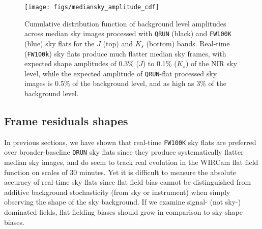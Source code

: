 \documentclass[iop]{emulateapj}
\begin{document}
\begin{figure}[t]
\centering
\texttt{[image: figs/mediansky\_amplitude\_cdf]}
\caption{Cumulative distribution function of background level amplitudes across median sky images processed with \texttt{QRUN} (black) and \texttt{FW100K} (blue) sky flats for the $J$ (top) and $K_s$ (bottom) bands. Real-time (\texttt{FW100k}) sky flats produce much flatter median sky frames, with expected shape amplitudes of 0.3\% ($J$) to 0.1\% ($K_s$) of the NIR sky level, while the expected amplitude of \texttt{QRUN}-flat processed sky images is 0.5\% of the background level, and as high as 3\% of the background level.
}
\label{fig:mediansky_amplitude}
\end{figure}

\subsection{Frame residuals shapes}
\label{sec:frameblockresiduals}

In previous sections, we have shown that real-time \texttt{FW100K} sky flats are preferred over broader-baseline \texttt{QRUN} sky flats since they produce systematically flatter median sky images, and do seem to track real evolution in the WIRCam flat field function on scales of 30 minutes.
Yet it is difficult to measure the absolute accuracy of real-time sky flats since flat field bias cannot be distinguished from additive background stochasticity (from sky or instrument) when simply observing the shape of the sky background.
If we examine signal- (not sky-) dominated fields, flat fielding biases should grow in comparison to sky shape biases.
\end{document}
